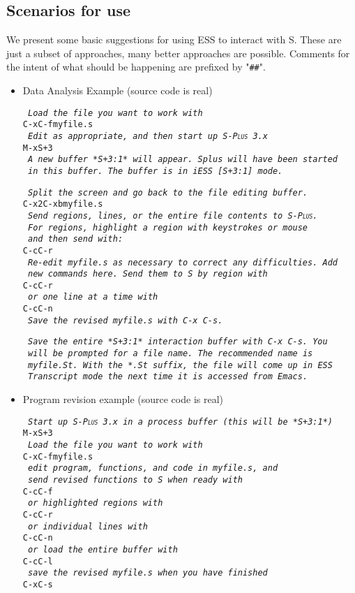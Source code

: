 \documentclass{article}
\newcommand*{\Splus}{\textsc{S-Plus}}
\newcommand*{\Scmt}[1]{\hbox{\qquad {\footnotesize \#\#} \textsl{#1}}}
\newenvironment{Salltt}{\small\begin{alltt}}{\end{alltt}}
\begin{document}
\subsection{Scenarios for use}
\label{sec:S:scenarios}

We present some basic suggestions for using ESS to interact with S.
These are just a subset of approaches, many better approaches are
possible. Comments for the intent of what should be happening are
prefixed by "\verb+##+".

\begin{itemize}
\item Data Analysis Example (source code is real)
\begin{Salltt}
  \Scmt{Load the file you want to work with}
  C-x C-f myfile.s
  \Scmt{Edit as appropriate, and then start up \Splus~3.x}
  M-x S+3
  \Scmt{A new buffer *S+3:1* will appear.  Splus will have been started}
  \Scmt{in this buffer.  The buffer is in iESS [S+3:1] mode.}

  \Scmt{Split the screen and go back to the file editing buffer.}
  C-x 2 C-x b myfile.s
  \Scmt{Send regions, lines, or the entire file contents to \Splus.}
  \Scmt{For regions, highlight a region with keystrokes or mouse}
  \Scmt{and then send with:}
  C-c C-r
  \Scmt{Re-edit myfile.s as necessary to correct any difficulties.  Add}
  \Scmt{new commands here.  Send them to S by region with}
  C-c C-r
  \Scmt{or one line at a time with}
  C-c C-n
  \Scmt{Save the revised myfile.s with C-x C-s.}

  \Scmt{Save the entire *S+3:1* interaction buffer with C-x C-s.  You}
  \Scmt{will be prompted for a file name.  The recommended name is}
  \Scmt{myfile.St.  With the *.St suffix, the file will come up in ESS}
  \Scmt{Transcript mode the next time it is accessed from Emacs.}
  \end{Salltt}

\item Program revision example (source code is real)
  \begin{Salltt}
  \Scmt{Start up \Splus~3.x in a process buffer (this will be *S+3:1*)}
  M-x S+3
  \Scmt{Load the file you want to work with}
  C-x C-f myfile.s
  \Scmt{edit program, functions, and code in myfile.s, and}
  \Scmt{send revised functions to S when ready with}
  C-c C-f
  \Scmt{or highlighted regions with}
  C-c C-r
  \Scmt{or individual lines with}
  C-c C-n
  \Scmt{or load the entire buffer with} 
  C-c C-l
  \Scmt{save the revised myfile.s when you have finished}
  C-x C-s
  \end{Salltt}


\end{itemize}
\end{document}
